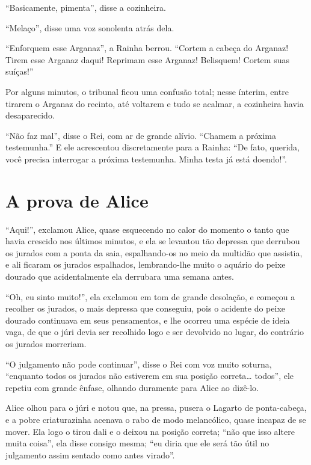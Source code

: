 ``Basicamente, pimenta'', disse a cozinheira.

``Melaço'', disse uma voz sonolenta atrás dela.

``Enforquem esse Arganaz'', a Rainha berrou. ``Cortem a cabeça do
Arganaz! Tirem esse Arganaz daqui! Reprimam esse Arganaz! Belisquem!
Cortem suas suíças!''

Por alguns minutos, o tribunal ficou uma confusão total; nesse ínterim,
entre tirarem o Arganaz do recinto, até voltarem e tudo se acalmar, a
cozinheira havia desaparecido.

``Não faz mal'', disse o Rei, com ar de grande alívio. ``Chamem a
próxima testemunha.'' E ele acrescentou discretamente para a Rainha:
``De fato, querida, você precisa interrogar a próxima testemunha. Minha
testa já está doendo!''.


\quebra\chapter{A prova de Alice}

``Aqui!'', exclamou Alice, quase esquecendo no calor do momento o tanto
que havia crescido nos últimos minutos, e ela se levantou tão depressa
que derrubou os jurados com a ponta da saia, espalhando-os no meio da
multidão que assistia, e ali ficaram os jurados espalhados,
lembrando-lhe muito o aquário do peixe dourado que acidentalmente ela
derrubara uma semana antes.

``Oh, eu sinto muito!'', ela exclamou em tom de grande desolação, e
começou a recolher os jurados, o mais depressa que conseguiu, pois o
acidente do peixe dourado continuava em seus pensamentos, e lhe ocorreu
uma espécie de ideia vaga, de que o júri devia ser recolhido logo e ser
devolvido no lugar, do contrário os jurados morreriam.

``O julgamento não pode continuar'', disse o Rei com voz muito soturna,
``enquanto todos os jurados não estiverem em sua posição correta\ldots{}
todos'', ele repetiu com grande ênfase, olhando duramente para Alice ao
dizê-lo.

Alice olhou para o júri e notou que, na pressa, pusera o Lagarto de
ponta-cabeça, e a pobre criaturazinha acenava o rabo de modo
melancólico, quase incapaz de se mover. Ela logo o tirou dali e o
deixou na posição correta; ``não que isso altere muita coisa'', ela
disse consigo mesma; ``eu diria que ele será tão útil no julgamento
assim sentado como antes virado''.

